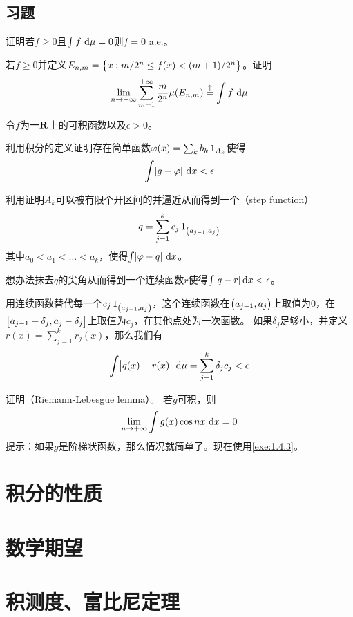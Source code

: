 \documentclass[../main.tex]{subfiles}
\begin{document}
\subsection*{习题}
\begin{exercise}
	\item 证明若\(f\geq 0\)且\(\int f\,\dif\mu=0\)则\(f=0\) a.e.。
	\item \label{exe:1.4.3} 若\(f\geq0\)并定义\(E_{n,m}=\cbr{x:m/2^n\leq f(x)<(m+1)/2^n}\)。证明
	\[\lim\limits_{n\rightarrow+\infty}\sum_{m=1}^{+\infty}\frac{m}{2^n}\mu(E_{n,m})\stackrel{\uparrow}{=}\int f\,\dif\mu\]
	\item 令\(f\)为一\(\mathbf{R}\)上的可积函数以及\(\epsilon>0\)。
	\begin{exercise}
		\item
		利用积分的定义证明存在简单函数\(\varphi(x)=\sum_kb_k\operatorname{1}_{A_k}\)使得\[\int\envert{g-\varphi}\,\dif x<\epsilon\]
		\item 利用证明\(A_k\)可以被有限个开区间的并逼近从而得到一个（step function）
		\[q=\sum_{j=1}^kc_j\indicator_{\intoo{a_{j-1},a_j}}\]
		其中\(a_0<a_1<\dots<a_k\)，使得\(\int\envert{\varphi-q}\,\dif x\)。
		\item 想办法抹去\(q\)的尖角从而得到一个连续函数\(r\)使得\(\int\envert{q-r}\dif x<\epsilon\)。
		\item 用连续函数替代每一个\(c_j\indicator_{\intoo{a_{j-1},a_j}}\)，这个连续函数在\(\intoo{a_{j-1},a_j}\)上取值为\(0\)，在\(\intcc{a_{j-1}+\delta_j,a_j-\delta_j}\)上取值为\(c_j\)，在其他点处为一次函数。
		如果\(\delta_j\)足够小，并定义\(r(x)=\sum_{j=1}^kr_j(x)\)，那么我们有
		\[\int\envert{q(x)-r(x)}\,\dif\mu=\sum_{j=1}^k\delta_jc_j<\epsilon\]
	\end{exercise}
	\item 证明（Riemann-Lebesgue lemma）。
	若\(g\)可积，则
	\[\lim\limits_{n\rightarrow+\infty}\int g(x)\cos nx\,\dif x=0\]
	提示：如果\(g\)是阶梯状函数，那么情况就简单了。现在使用\ref{exe:1.4.3}。
\end{exercise}

\section{积分的性质} \label{sec:1.5}
\section{数学期望} \label{sec:1.6}
\begin{theorem}
\label{thm:1.6.9}
\end{theorem}
\section{积测度、富比尼定理} \label{sec:1.7}
\begin{theorem}
\label{thm:1.7.2}
\end{theorem}
\begin{exercise}
	\item
	\item
	\item
	\item \label{e1.7.4}
\end{exercise}
\end{document}
